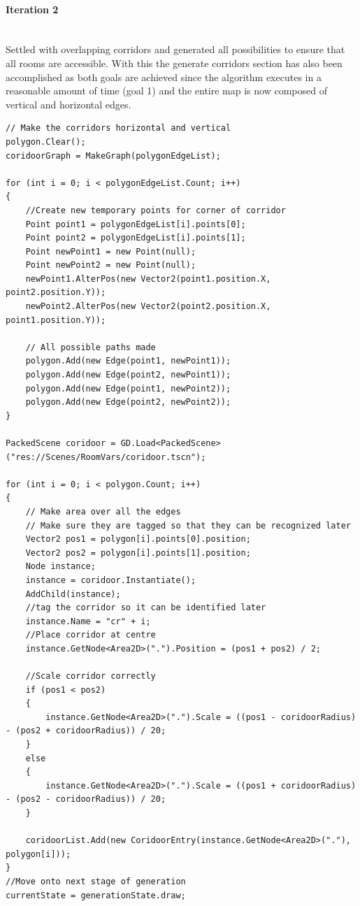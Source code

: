 \documentclass{article}
\newcommand{\myparagraph}[1]{\paragraph{#1}\mbox{}\\} %
\begin{document}
\myparagraph{Iteration 2}
Settled with overlapping corridors and generated all possibilities to ensure that all rooms are accessible. With this the generate corridors section has also been accomplished as both goals are achieved since the algorithm executes in a reasonable amount of time (goal 1) and the entire map is now composed of vertical and horizontal edges.
\begin{lstlisting}
// Make the corridors horizontal and vertical
polygon.Clear();
coridoorGraph = MakeGraph(polygonEdgeList);

for (int i = 0; i < polygonEdgeList.Count; i++)
{
    //Create new temporary points for corner of corridor
    Point point1 = polygonEdgeList[i].points[0];
    Point point2 = polygonEdgeList[i].points[1];
    Point newPoint1 = new Point(null);
    Point newPoint2 = new Point(null);
    newPoint1.AlterPos(new Vector2(point1.position.X, point2.position.Y));
    newPoint2.AlterPos(new Vector2(point2.position.X, point1.position.Y));

    // All possible paths made
    polygon.Add(new Edge(point1, newPoint1));
    polygon.Add(new Edge(point2, newPoint1));
    polygon.Add(new Edge(point1, newPoint2));
    polygon.Add(new Edge(point2, newPoint2));
}

PackedScene coridoor = GD.Load<PackedScene>("res://Scenes/RoomVars/coridoor.tscn");

for (int i = 0; i < polygon.Count; i++)
{
    // Make area over all the edges
    // Make sure they are tagged so that they can be recognized later
    Vector2 pos1 = polygon[i].points[0].position;
    Vector2 pos2 = polygon[i].points[1].position;
    Node instance;
    instance = coridoor.Instantiate();
    AddChild(instance);
    //tag the corridor so it can be identified later
    instance.Name = "cr" + i;
    //Place corridor at centre 
    instance.GetNode<Area2D>(".").Position = (pos1 + pos2) / 2;

	//Scale corridor correctly
    if (pos1 < pos2)
    {
        instance.GetNode<Area2D>(".").Scale = ((pos1 - coridoorRadius) - (pos2 + coridoorRadius)) / 20;
    }
    else
    {
        instance.GetNode<Area2D>(".").Scale = ((pos1 + coridoorRadius) - (pos2 - coridoorRadius)) / 20;
    }

    coridoorList.Add(new CoridoorEntry(instance.GetNode<Area2D>("."), polygon[i]));
}
//Move onto next stage of generation
currentState = generationState.draw;
\end{lstlisting}
\end{document}
